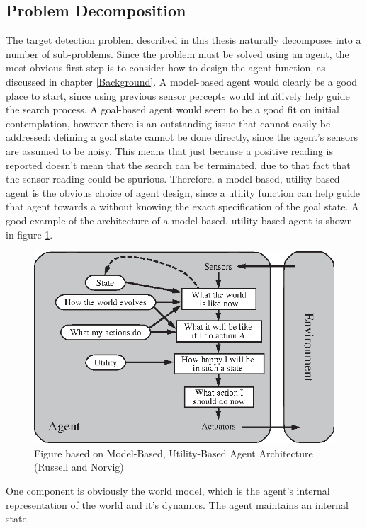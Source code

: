 \subsection{Problem Decomposition}
The target detection problem described in this thesis naturally decomposes into a number of sub-problems. %
Since the problem must be solved using an agent, the most obvious first step is to consider how to design the agent function, as discussed in chapter \ref{Background}. A model-based agent would clearly be a good place to start, since using previous sensor percepts would intuitively help guide the search process. A goal-based agent would seem to be a good fit on initial contemplation, however there is an outstanding issue that cannot easily be addressed: defining a goal state cannot be done directly, since the agent's sensors are assumed to be noisy. This means that just because a positive reading is reported doesn't mean that the search can be terminated, due to that fact that the sensor reading could be spurious. Therefore, a model-based, utility-based agent is the obvious choice of agent design, since a utility function can help guide that agent towards a  without knowing the exact specification of the goal state. A good example of the architecture of a model-based, utility-based agent is shown in figure \ref{fig:model_based_utility_based}.
\begin{figure}
    \centering
    \includegraphics{Chapters/MultiAgentTargetDetection/BayesianFiltering/Figs/utility-based-agent.eps}
    \caption{Figure based on Model-Based, Utility-Based Agent Architecture (Russell and Norvig)\cite[p.~54]{AIAMA}}
    \label{fig:model_based_utility_based}
\end{figure}
One component is obviously the world model, which is the agent's internal representation of the world and it's dynamics. The agent maintains an internal state
